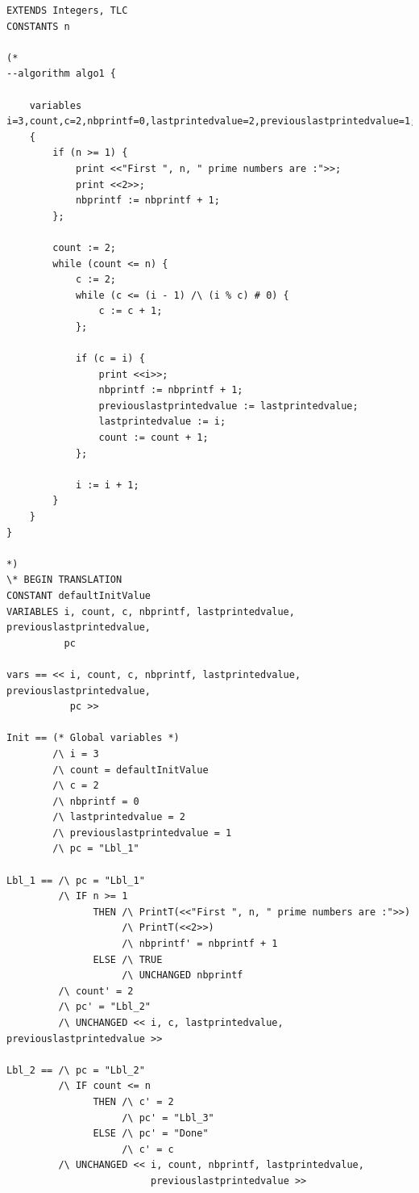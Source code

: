 \documentclass{scrreprt}
\begin{document}
\begin{lstlisting}
EXTENDS Integers, TLC
CONSTANTS n

(*
--algorithm algo1 {

    variables i=3,count,c=2,nbprintf=0,lastprintedvalue=2,previouslastprintedvalue=1;
    {
        if (n >= 1) {
            print <<"First ", n, " prime numbers are :">>;
            print <<2>>;
            nbprintf := nbprintf + 1;
        };

        count := 2;
        while (count <= n) {
            c := 2;
            while (c <= (i - 1) /\ (i % c) # 0) {
                c := c + 1;
            };

            if (c = i) {
                print <<i>>;
                nbprintf := nbprintf + 1;
                previouslastprintedvalue := lastprintedvalue;
                lastprintedvalue := i;
                count := count + 1;
            };

            i := i + 1;
        }
    }
}

*)
\* BEGIN TRANSLATION
CONSTANT defaultInitValue
VARIABLES i, count, c, nbprintf, lastprintedvalue, previouslastprintedvalue,
          pc

vars == << i, count, c, nbprintf, lastprintedvalue, previouslastprintedvalue,
           pc >>

Init == (* Global variables *)
        /\ i = 3
        /\ count = defaultInitValue
        /\ c = 2
        /\ nbprintf = 0
        /\ lastprintedvalue = 2
        /\ previouslastprintedvalue = 1
        /\ pc = "Lbl_1"

Lbl_1 == /\ pc = "Lbl_1"
         /\ IF n >= 1
               THEN /\ PrintT(<<"First ", n, " prime numbers are :">>)
                    /\ PrintT(<<2>>)
                    /\ nbprintf' = nbprintf + 1
               ELSE /\ TRUE
                    /\ UNCHANGED nbprintf
         /\ count' = 2
         /\ pc' = "Lbl_2"
         /\ UNCHANGED << i, c, lastprintedvalue, previouslastprintedvalue >>

Lbl_2 == /\ pc = "Lbl_2"
         /\ IF count <= n
               THEN /\ c' = 2
                    /\ pc' = "Lbl_3"
               ELSE /\ pc' = "Done"
                    /\ c' = c
         /\ UNCHANGED << i, count, nbprintf, lastprintedvalue,
                         previouslastprintedvalue >>


\end{lstlisting}
\end{document}
